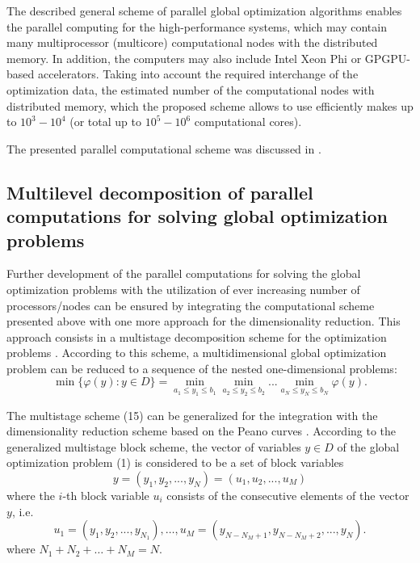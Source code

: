 \documentclass[
11pt,%
tightenlines,%
twoside,%
onecolumn,%
nofloats,%
nobibnotes,%
nofootinbib,%
superscriptaddress,%
noshowpacs,%
centertags]%
{revtex4}
\begin{document}
The described general scheme of parallel global optimization algorithms enables the parallel computing for the high-performance systems, which may contain many multiprocessor (multicore) computational nodes with the distributed memory. In addition, the computers may also include Intel Xeon Phi or GPGPU-based accelerators. Taking into account the required interchange of the optimization data, the estimated number of the computational nodes with distributed memory, which the proposed scheme allows to use efficiently makes up to $10^3-10^4$ (or total up to $10^5-10^6$ computational cores). 

The presented parallel computational scheme was discussed in \cite{Strongin1, Strongin2, Strongin5, Gergel1}.


\subsection{Multilevel decomposition of parallel computations for solving global optimization problems}

Further development of the parallel computations for solving the global optimization problems with the utilization of ever increasing number of processors/nodes can be ensured by integrating the computational scheme presented above with one more approach for the dimensionality reduction. This approach consists in a multistage decomposition scheme for the optimization problems \cite{Strongin2, Sergeyev4, Gergel5}. According to this scheme, a multidimensional global optimization problem can be reduced to a sequence of the nested one-dimensional problems:
\begin{equation}
\min \lbrace \varphi(y): y \in D \rbrace = \min_{a_1 \leq y_1 \leq b_1} \min_{a_2 \leq y_2 \leq b_2} ... \min_{a_N \leq y_N \leq b_N} \varphi(y).
\end{equation}

The multistage scheme (15) can be generalized for the integration with the dimensionality reduction scheme based on the Peano curves \cite{Sysoyev}. According to the generalized multistage block scheme, the vector of variables $y \in D$ of the global optimization problem (1) is considered to be a set of block variables
\[
y = (y_1, y_2, ..., y_N) = (u_1, u_2, ..., u_M)
\]
where the $i$-th block variable $u_i$ consists of the consecutive elements of the vector $y$, i.e.
\[
u_1 = (y_1, y_2, ..., y_{N_1}), \dots, 
u_M = (y_{N-N_M+1}, y_{N-N_M+2}, ..., y_N).
\]
where $N_1 + N_2 + \dots + N_M = N$.
\end{document}
